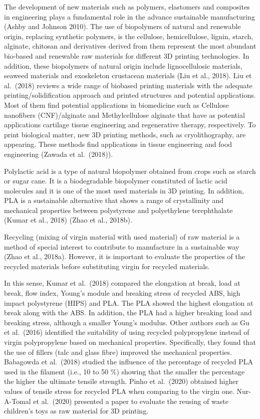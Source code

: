 \documentclass[]{elsarticle} %
\begin{document}
The development of new materials such as polymers, elastomers and
composites in engineering plays a fundamental role in the advance
sustainable manufacturing (Ashby and Johnson 2010). The use of
biopolymers of natural and renewable origin, replacing synthetic
polymers, is the cellulose, hemicellulose, lignin, starch, alginate,
chitosan and derivatives derived from them represent the most abundant
bio-based and renewable raw materials for different 3D printing
technologies. In addition, these biopolymers of natural origin include
lignocellulosic materials, seaweed materials and exoskeleton crustacean
materials (Liu et al., 2018). Liu et al.~(2018) reviews a wide range of
biobased printing materials with the adequate printing/solidification
approach and printed structures and potential applications. Most of them
find potential applications in biomedicine such as Cellulose nanofibers
(CNF)/alginate and Methylcellulose alginate that have as potential
applications cartilage tissue engineering and regenerative therapy,
respectively. To print biological matter, new 3D printing methods, such
as cryolithography, are appearing. These methods find applications in
tissue engineering and food engineering (Zawada et al.~(2018)).

Polylactic acid is a type of natural biopolymer obtained from crops such
as starch or sugar cane. It is a biodegradable biopolymer constituted of
lactic acid molecules and it is one of the most used materials in 3D
printing. In addition, PLA is a sustainable alternative that shows a
range of crystallinity and mechanical properties between polystyrene and
polyethylene terephthalate (Kumar et al., 2018) (Zhao et al., 2018b).

Recycling (mixing of virgin material with used material) of raw material
is a method of special interest to contribute to manufacture in a
sustainable way (Zhao et al., 2018a). However, it is important to
evaluate the properties of the recycled materials before substituting
virgin for recycled materials.

In this sense, Kumar et al.~(2018) compared the elongation at break,
load at break, flow index, Young's module and breaking stress of
recycled ABS, high impact polystyrene (HIPS) and PLA. The PLA showed the
highest elongation at break along with the ABS. In addition, the PLA had
a higher breaking load and breaking stress, although a smaller Young's
modulus. Other authors such as Gu et al.~(2016) identified the
suitability of using recycled polypropylene instead of virgin
polypropylene based on mechanical properties. Specifically, they found
that the use of fillers (talc and glass fibre) improved the mechanical
properties. Babagowda et al.~(2018) studied the influence of the
percentage of recycled PLA used in the filament (i.e., 10 to 50 \%)
showing that the smaller the percentage the higher the ultimate tensile
strength. Pinho et al.~(2020) obtained higher values of tensile stress
for recycled PLA when comparing to the virgin one. Nur-A-Tomal et
al.~(2020) presented a paper to evaluate the reusing of waste children's
toys as raw material for 3D printing.
\end{document}

